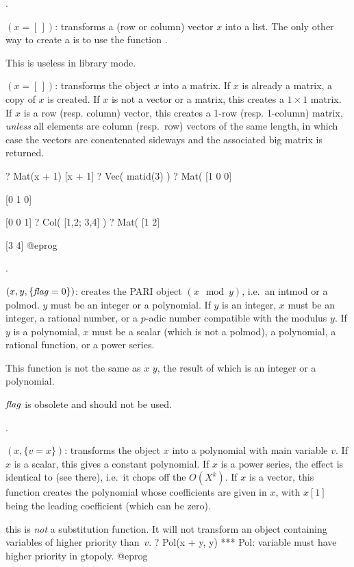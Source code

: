 .

$({x=[\,]})$: transforms a (row or column) vector $x$
into a list. The only other way to create a  is to use the
function .

This is useless in library mode.

$({x=[\,]})$: transforms the object $x$ into a matrix.
If $x$ is already a matrix, a copy of $x$ is created.
If $x$ is not a vector or a matrix, this creates a $1\times 1$ matrix.
If $x$ is a row (resp. column) vector, this creates a 1-row (resp.
1-column) matrix, \emph{unless} all elements are column (resp.~row) vectors
of the same length, in which case the vectors are concatenated sideways
and the associated big matrix is returned.

\bprog
  ? Mat(x + 1)
  [x + 1]
  ? Vec( matid(3) )
  ? Mat(%
  [1 0 0]

  [0 1 0]

  [0 0 1]
  ? Col( [1,2; 3,4] )
  ? Mat(%
  [1 2]

  [3 4]
@eprog

.

$(x,y,\{\hbox{\it f\kern0pt lag\/}=0\})$:\label{se:Mod} creates the PARI object
$(x \mod y)$, i.e.~an intmod or a polmod. $y$ must be an integer or a
polynomial. If $y$ is an integer, $x$ must be an integer, a rational
number, or a $p$-adic number compatible with the modulus $y$. If $y$ is a
polynomial, $x$ must be a scalar (which is not a polmod), a polynomial, a
rational function, or a power series.

This function is not the same as $x$ \kbd{\%} $y$, the result of which is an
integer or a polynomial.

$\hbox{\it f\kern0pt lag\/}$ is obsolete and should not be used.

.

$(x,\{v=x\})$: transforms the object $x$ into a polynomial with
main variable $v$. If $x$ is a scalar, this gives a constant polynomial. If
$x$ is a power series, the effect is identical to  (see there),
i.e.~it chops off the $O(X^k)$. If $x$ is a vector, this function creates
the polynomial whose coefficients are given in $x$, with $x[1]$ being the
leading coefficient (which can be zero).

 this is \emph{not} a substitution function. It will not
transform an object containing variables of higher priority than~$v$.
\bprog
? Pol(x + y, y)
  *** Pol: variable must have higher priority in gtopoly.
@eprog


